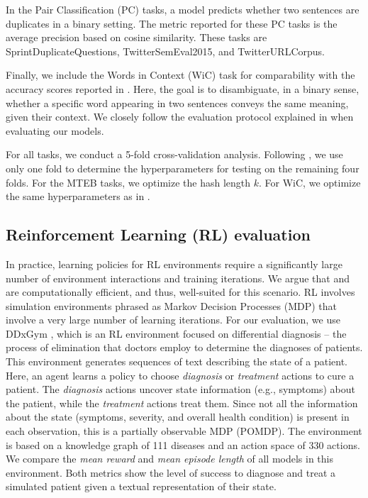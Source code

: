 \par
In the Pair Classification (PC) tasks, a model predicts whether two sentences are duplicates in a binary setting.
The metric reported for these PC tasks is the average precision based on cosine similarity.
These tasks are SprintDuplicateQuestions, TwitterSemEval2015, and TwitterURLCorpus.

\par
Finally, we include the Words in Context (WiC) \cite{wic} task for comparability with the accuracy scores reported in \cite{flyvec}.
Here, the goal is to disambiguate, in a binary sense, whether a specific word appearing in two sentences conveys the same meaning, given their context.
We closely follow the evaluation protocol explained in \cite{flyvec} when evaluating our models.

\par
For all tasks, we conduct a 5-fold cross-validation analysis.
Following \cite{flyvec}, we use only one fold to determine the hyperparameters for testing on the remaining four folds.
For the MTEB tasks, we optimize the hash length $k$. 
For WiC, we optimize the same hyperparameters as in \cite{flyvec}.

\subsection{Reinforcement Learning (RL) evaluation}
In practice, learning policies for RL environments require a significantly large number of environment interactions and training iterations.
We argue that \pflyvec and \methodname are computationally efficient, and thus, well-suited for this scenario.
RL involves simulation environments phrased as Markov Decision Processes (MDP) that involve a very large number of learning iterations.
For our evaluation, we use DDxGym \cite{ddxgym}, which is an RL environment focused on differential diagnosis -- the process of elimination that doctors employ to determine the diagnoses of patients.
This environment generates sequences of text describing the state of a patient.
Here, an agent learns a policy to choose \textit{diagnosis} or \textit{treatment} actions to cure a patient.
The \textit{diagnosis} actions uncover state information (e.g., symptoms) about the patient, while the \textit{treatment} actions treat them. 
Since not all the information about the state (symptoms, severity, and overall health condition) is present in each observation, this is a partially observable MDP (POMDP).
The environment is based on a knowledge graph of 111 diseases and an action space of 330 actions.
We compare the \textit{mean reward} and \textit{mean episode length} of all models in this environment. 
Both metrics show the level of success to diagnose and treat a simulated patient given a textual representation of their state. 

